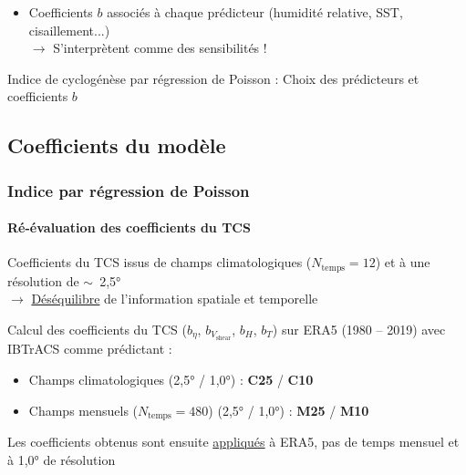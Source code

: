 \documentclass[aspectratio=169, usepdftitle=false, xcolor={dvipsnames}, 9pt,table]{beamer}
\begin{document}
\begin{frame}[c]
\begin{definition}
\begin{itemize}
            \item Coefficients $b$ associés à chaque prédicteur (humidité relative, SST, cisaillement...)\\
                $\longrightarrow$ S'interprètent comme des \alert{sensibilités} !
        \end{itemize} 
    \end{definition}
    \vspace{1em}
    \begin{center}
        \small
        Indice de cyclogénèse par régression de Poisson : Choix des \alert{prédicteurs} et \alert{coefficients} $b$
    \end{center}
\end{frame}

\subsection{Coefficients du modèle}
\begin{frame}[c]
    \frametitle{Indice par régression de Poisson}
    \framesubtitle{Ré-évaluation des coefficients du TCS}
    \small
    \begin{definition}
        Coefficients du TCS issus de champs \alert{climatologiques} ($N_\text{temps} = 12$) et à une résolution de \mbox{$\sim$ 2,5°}\\
        $\longrightarrow$ \underline{Déséquilibre} de l'information spatiale et temporelle
    \end{definition}
    \vspace{2em}
    \begin{block}
        Calcul des coefficients du TCS ($b_\eta$, $b_{V_\text{shear}}$, $b_H$, $b_T$) sur ERA5 (1980 -- 2019) avec IBTrACS comme prédictant :
        \begin{itemize}
            \item Champs \alert{climatologiques} (2,5° / 1,0°) : \textbf{C25} / \textbf{C10}
            \item Champs \alert{mensuels} ($N_\text{temps} = 480$) (2,5° / 1,0°) : \textbf{M25} / \textbf{M10}
        \end{itemize}
        \tcblower
        Les coefficients obtenus sont ensuite \underline{appliqués} à ERA5, pas de temps \alert{mensuel} et à \alert{1,0°} de résolution
    \end{block}
\end{frame}
\end{document}
